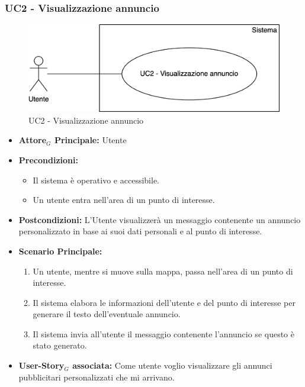 \documentclass[11pt]{article}
\begin{document}
\begin{justify}

\subsubsection{\textbf{UC2 - Visualizzazione annuncio}}
\begin{figure}[H]
    \centering
    \includegraphics[width=0.7\linewidth]{UC2image.png}
    \caption{UC2 - Visualizzazione annuncio}
    \label{fig:UC2}
\end{figure}
\begin{itemize}
    \item \textbf{Attore$_G$ Principale:} Utente
    \item \textbf{Precondizioni:} 
        \begin{itemize}
    	\item Il sistema è operativo e accessibile.
    	\item Un utente entra nell'area di un punto di interesse.
        \end{itemize}
    \item \textbf{Postcondizioni:} L'Utente visualizzerà un messaggio contenente un annuncio personalizzato in base ai suoi dati personali e al punto di interesse.
    \item \textbf{Scenario Principale:} 
        \begin{enumerate}
            \item Un utente, mentre si muove sulla mappa, passa nell'area di un punto di interesse.
            \item Il sistema elabora le informazioni dell'utente e del punto di interesse per generare il testo dell'eventuale annuncio.
            \item Il sistema invia all'utente il messaggio contenente l'annuncio se questo è stato generato.
        \end{enumerate}
    \item \textbf{User-Story$_G$ associata:} Come utente voglio visualizzare gli annunci pubblicitari personalizzati che mi arrivano.
\end{itemize}

\end{justify}
\end{document}
